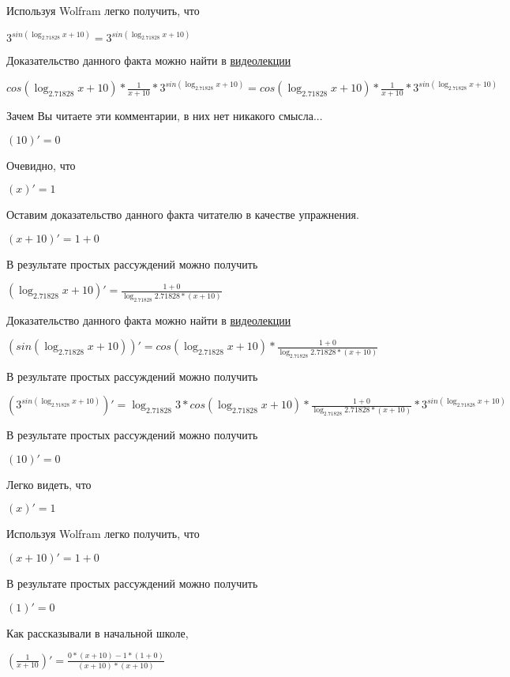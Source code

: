 \documentclass[12pt,a4paper,fleqn]{article}
\theoremstyle{definition}
\begin{document}
Используя Wolfram легко получить, что

${ 3 }^{sin(\log_{ 2.71828 }{ x  +  10 })} = { 3 }^{sin(\log_{ 2.71828 }{ x  +  10 })}$

Доказательство данного факта можно найти в \href{https://www.youtube.com/watch?v=dQw4w9WgXcQ}{видеолекции}

$cos(\log_{ 2.71828 }{ x  +  10 }) * \frac{ 1 }{ x  +  10 }
 * { 3 }^{sin(\log_{ 2.71828 }{ x  +  10 })} = cos(\log_{ 2.71828 }{ x  +  10 }) * \frac{ 1 }{ x  +  10 }
 * { 3 }^{sin(\log_{ 2.71828 }{ x  +  10 })}$

Зачем Вы читаете эти комментарии, в них нет никакого смысла...

$( 10 )' =  0 $

Очевидно, что

$( x )' =  1 $

Оставим доказательство данного факта читателю в качестве упражнения.

$( x  +  10 )' =  1  +  0 $

В результате простых рассуждений можно получить

$(\log_{ 2.71828 }{ x  +  10 })' = \frac{ 1  +  0 }{\log_{ 2.71828 }{ 2.71828 } * ( x  +  10 )}
$

Доказательство данного факта можно найти в \href{https://www.youtube.com/watch?v=dQw4w9WgXcQ}{видеолекции}

$(sin(\log_{ 2.71828 }{ x  +  10 }))' = cos(\log_{ 2.71828 }{ x  +  10 }) * \frac{ 1  +  0 }{\log_{ 2.71828 }{ 2.71828 } * ( x  +  10 )}
$

В результате простых рассуждений можно получить

$({ 3 }^{sin(\log_{ 2.71828 }{ x  +  10 })})' = \log_{ 2.71828 }{ 3 } * cos(\log_{ 2.71828 }{ x  +  10 }) * \frac{ 1  +  0 }{\log_{ 2.71828 }{ 2.71828 } * ( x  +  10 )}
 * { 3 }^{sin(\log_{ 2.71828 }{ x  +  10 })}$

В результате простых рассуждений можно получить

$( 10 )' =  0 $

Легко видеть, что

$( x )' =  1 $

Используя Wolfram легко получить, что

$( x  +  10 )' =  1  +  0 $

В результате простых рассуждений можно получить

$( 1 )' =  0 $

Как рассказывали в начальной школе,

$(\frac{ 1 }{ x  +  10 }
)' = \frac{ 0  * ( x  +  10 ) -  1  * ( 1  +  0 )}{( x  +  10 ) * ( x  +  10 )}
$
\end{document}
